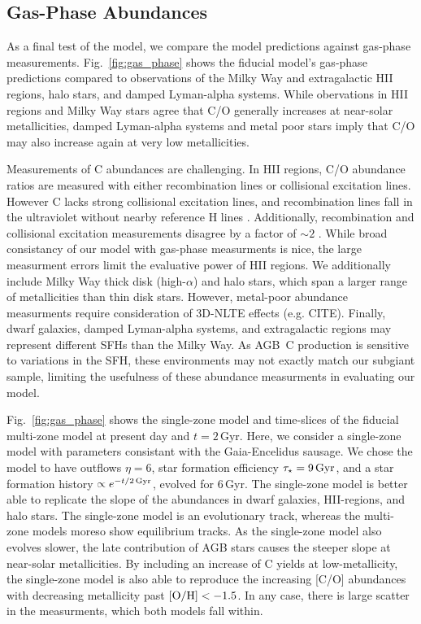 \documentclass[fleqn,usenatbib]{mnras}
\newcommand{\agb}{AGB}
\newcommand{\sfh}{SFH} %
\newcommand{\about}[1]{${\sim} #1$}
\begin{document}
\subsection{Gas-Phase Abundances}\label{sec:gas}

As a final test of the model, we compare the model predictions against gas-phase measurements. Fig.~\ref{fig:gas_phase} shows the fiducial model's gas-phase predictions compared to observations of the Milky Way and extragalactic HII regions, halo stars, and damped Lyman-alpha systems. 
While obervations in HII regions and Milky Way stars agree that C/O generally increases at near-solar metallicities, damped Lyman-alpha systems and metal poor stars imply that C/O may also increase again at very low metallicities. 



Measurements of C abundances are challenging. 
In HII regions, C/O abundance ratios are measured with either recombination lines or collisional excitation lines. However C lacks strong collisional excitation lines, and recombination lines fall in the ultraviolet without nearby reference H lines \citep{skillman+20}. Additionally, recombination and collisional excitation measurements disagree by a factor of \about{2} \citep{GR07}. 
While broad consistancy of our model with gas-phase measurments is nice, the large measurment errors limit the evaluative power of HII regions.
We additionally include Milky Way thick disk (high-$\alpha$) and halo stars, which span a larger range of metallicities than thin disk stars. However, metal-poor abundance measurments require consideration of 3D-NLTE effects (e.g. CITE). 
Finally, dwarf galaxies, damped Lyman-alpha systems, and extragalactic regions may represent different \sfh{}s than the Milky Way.
As \agb\ C production is sensitive to variations in the \sfh, these environments may not exactly match our subgiant sample, limiting the usefulness of these abundance measurments in evaluating our model.


Fig.~\ref{fig:gas_phase} shows the single-zone model and time-slices of the fiducial multi-zone model at present day and $t=2$\,Gyr. 
Here, we consider a single-zone model with parameters consistant with the Gaia-Encelidus sausage\footnotemark{}. We chose the model to have outflows $\eta=6$, star formation efficiency $\tau_{\star}=9\,{\rm Gyr}$, and a star formation history $\propto e^{-t/2{\rm\,Gyr}}$, evolved for 6\,Gyr. 
The single-zone model is better able to replicate the slope of the abundances in dwarf galaxies, HII-regions, and halo stars. The single-zone model is an evolutionary track, whereas the multi-zone models moreso show equilibrium tracks. As the single-zone model also evolves slower, the late contribution of AGB stars causes the steeper slope at near-solar metallicities. By including an increase of C yields at low-metallicity, the single-zone model is also able to reproduce the increasing [C/O] abundances with decreasing metallicity past ${\rm [O/H]} < -1.5$.
In any case, there is large scatter in the measurments, which both models fall within.
\end{document}
